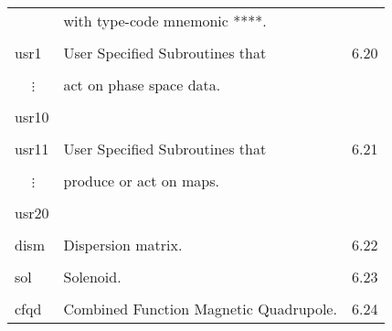 \begin{center}
\begin{tabular}{lll}
               &         with type-code mnemonic ****.        &      \\
\vspace{-3mm}& &\\
\hspace{1.5em}usr1    &         User Specified Subroutines that     &  \hspace{2em}6.20\\
\vspace{-7mm}& &\\
\hspace{1.5em}\ \ \,$\vdots$ &         act on phase space data.             &      \\
\vspace{-7mm}& &\\
\hspace{1.5em}usr10    &                                             &      \\
\vspace{-3mm}& &\\
\hspace{1.5em}usr11    &         User Specified Subroutines that     &  \hspace{2em}6.21\\
\vspace{-7mm}& &\\
\hspace{1.5em}\ \ \,$\vdots$ &         produce or act on maps.              &      \\
\vspace{-7mm}& &\\
\hspace{1.5em}usr20    &                                             &      \\
\vspace{-3mm}& &\\
\hspace{1.5em}dism    &         Dispersion matrix.                   &  \hspace{2em}6.22\\
\vspace{-3mm}& &\\
\hspace{1.5em}sol    &         Solenoid.                            &  \hspace{2em}6.23\\
\vspace{-3mm}& &\\
\hspace{1.5em}cfqd    &       Combined Function Magnetic Quadrupole. &  \hspace{2em}6.24\\

\end{tabular}
\end{center}
